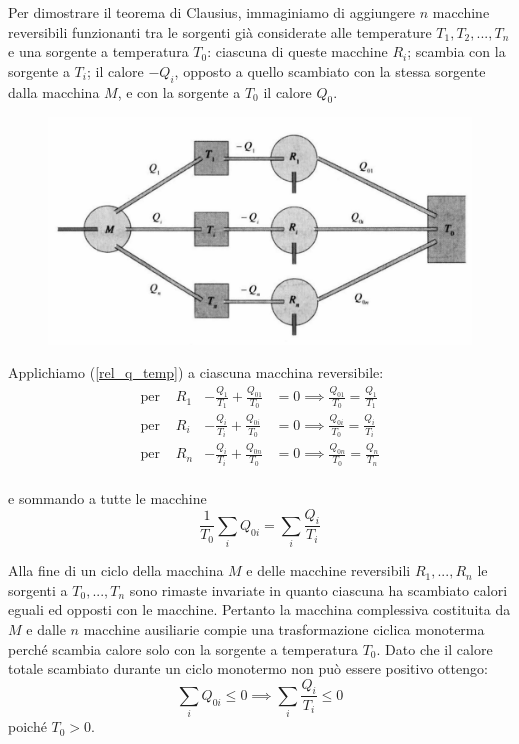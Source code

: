 \documentclass[class=book, crop=false, oneside, 12pt]{standalone}
\begin{document}
Per dimostrare il teorema di Clausius, immaginiamo di aggiungere \(n\) macchine reversibili funzionanti tra le sorgenti già considerate alle temperature \(T_1 , T_2 , ... , T_n\) e una sorgente a temperatura \(T_0\): ciascuna di queste macchine \(R_i\); scambia con la sorgente a \(T_i\); il calore \(-Q_i\), opposto a quello scambiato con la stessa sorgente dalla macchina \(M\), e con la sorgente a \(T_0\) il calore \(Q_0\).
\begin{figure}[h]
    \includegraphics[scale=0.4]{clausius_dim.png}
    \centering
    \caption{}
\end{figure}
Applichiamo (\ref{rel_q_temp}) a ciascuna macchina reversibile:\\
\begin{align*}
    \text{per } &R_1 & -\frac{Q_1}{T_1} + \frac{Q_{01}}{T_0} &= 0 \implies \frac{Q_{01}}{T_0} = \frac{Q_1}{T_1} \\
    \text{per } &R_i & -\frac{Q_i}{T_i} + \frac{Q_{0i}}{T_0} &= 0 \implies \frac{Q_{0i}}{T_0} = \frac{Q_i}{T_i} \\
    \text{per } &R_n & -\frac{Q_i}{T_i} + \frac{Q_{0n}}{T_0} &= 0 \implies \frac{Q_{0n}}{T_0} = \frac{Q_n}{T_n} \\
\end{align*}

e sommando a tutte le macchine 
\begin{equation*}
    \frac{1}{T_0} \sum_i Q_{0i} = \sum_{i} \frac{Q_i}{T_i}
\end{equation*}

Alla fine di un ciclo della macchina \(M\) e delle macchine reversibili \(R_1, ... , R_n\) le sorgenti a \(T_0, ... , T_n\) sono rimaste invariate in quanto ciascuna ha scambiato calori eguali ed opposti con le macchine. 
Pertanto la macchina complessiva costituita da \(M\) e dalle \(n\) macchine ausiliarie compie una trasformazione ciclica monoterma perché scambia calore solo con la sorgente a temperatura \(T_0\).
Dato che il calore totale scambiato durante un ciclo monotermo non può essere positivo ottengo:
\begin{equation*}
    \sum_i Q_{0i} \leq 0 \implies \sum_i \frac{Q_i}{T_i} \leq 0
\end{equation*}
poiché \(T_0 > 0 \).
\end{document}

